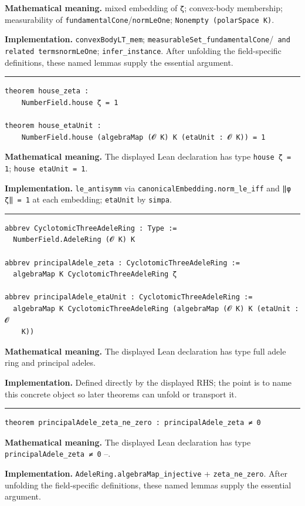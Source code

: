 \documentclass[UTF8,a4paper,11pt,fontset=fandol]{ctexart}
\theoremstyle{definition}
\newcommand{\statementsep}{\par\medskip\hrule\medskip}
\begin{document}
\noindent\textbf{Mathematical meaning.} mixed embedding of \texttt{ζ}; convex-body membership; measurability of \texttt{fundamentalCone}/\texttt{normLeOne}; \texttt{Nonempty (polarSpace K)}.\par
\noindent\textbf{Implementation.} \texttt{convexBodyLT\_\allowbreak{}mem}; \texttt{measurableSet\_\allowbreak{}fundamentalCone}/\texttt{ and related termsnormLeOne}; \texttt{infer\_\allowbreak{}instance}. After unfolding the field-specific definitions, these named lemmas supply the essential argument.\par
\statementsep
\begin{verbatim}
theorem house_zeta :
    NumberField.house ζ = 1

theorem house_etaUnit :
    NumberField.house (algebraMap (𝓞 K) K (etaUnit : 𝓞 K)) = 1
\end{verbatim}
\noindent\textbf{Mathematical meaning.} The displayed Lean declaration has type \texttt{house ζ = 1}; \texttt{house etaUnit = 1}.\par
\noindent\textbf{Implementation.} \texttt{le\_\allowbreak{}antisymm} via \texttt{canonicalEmbedding.\allowbreak{}norm\_\allowbreak{}le\_\allowbreak{}iff} and \texttt{‖φ ζ‖ = 1} at each embedding; \texttt{etaUnit} by \texttt{simpa}.\par
\statementsep
\begin{verbatim}
abbrev CyclotomicThreeAdeleRing : Type :=
  NumberField.AdeleRing (𝓞 K) K

abbrev principalAdele_zeta : CyclotomicThreeAdeleRing :=
  algebraMap K CyclotomicThreeAdeleRing ζ

abbrev principalAdele_etaUnit : CyclotomicThreeAdeleRing :=
  algebraMap K CyclotomicThreeAdeleRing (algebraMap (𝓞 K) K (etaUnit : 𝓞
    K))
\end{verbatim}
\noindent\textbf{Mathematical meaning.} The displayed Lean declaration has type full adele ring and principal adeles.\par
\noindent\textbf{Implementation.} Defined directly by the displayed RHS; the point is to name this concrete object so later theorems can unfold or transport it.\par
\statementsep
\begin{verbatim}
theorem principalAdele_zeta_ne_zero : principalAdele_zeta ≠ 0
\end{verbatim}
\noindent\textbf{Mathematical meaning.} The displayed Lean declaration has type \texttt{principalAdele\_\allowbreak{}zeta ≠ 0} --.\par
\noindent\textbf{Implementation.} \texttt{AdeleRing.\allowbreak{}algebraMap\_\allowbreak{}injective} + \texttt{zeta\_\allowbreak{}ne\_\allowbreak{}zero}. After unfolding the field-specific definitions, these named lemmas supply the essential argument.\par
\end{document}
